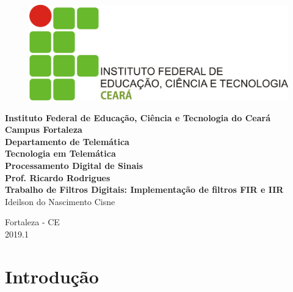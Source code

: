 \documentclass[12pt,fleqn]{article}
\begin{document}
\pagestyle {empty}


\begin{figure}[!htb]
    \centering
    \includegraphics[scale=0.6]{fig/IFCE.jpg}
\end{figure}

{\begin{center}
\large
{\bf
Instituto Federal de Educação, Ciência e Tecnologia do Ceará \\
Campus Fortaleza\\
Departamento de Telemática\\
Tecnologia em Telemática\\[3cm]
Processamento Digital de Sinais \\ 
Prof. Ricardo Rodrigues \\
Trabalho de Filtros Digitais: Implementação de filtros FIR e IIR } \\[3cm]
Ideilson do Nascimento Cisne\\
\end{center}}

\vfill
\begin{center} 
Fortaleza - CE \\
2019.1
\end{center}


\newpage
\tableofcontents
\pagestyle {plain}
\setcounter{page}{0} 


\newpage
\section{Introdução}
\end{document}
